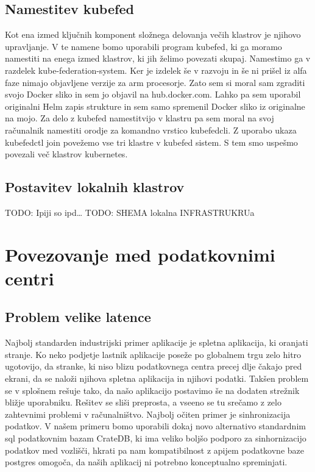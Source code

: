 \documentclass[a4paper, 12pt]{book}
\begin{document}
\section{Namestitev kubefed}
Kot ena izmed ključnih komponent složnega delovanja večih klastrov je njihovo upravljanje.
V te namene bomo uporabili program kubefed, ki ga moramo namestiti na enega izmed klastrov, ki jih želimo povezati skupaj.
Namestimo ga v razdelek kube-federation-system.
Ker je izdelek še v razvoju in še ni prišel iz alfa faze nimajo objavljene verzije za arm procesorje.
Zato sem si moral sam zgraditi svojo Docker sliko in sem jo objavil na hub.docker.com.
Lahko pa sem uporabil originalni Helm zapis strukture in sem samo spremenil Docker sliko iz originalne na mojo.
Za delo z kubefed namestitvijo v klastru pa sem moral na svoj računalnik namestiti orodje za komandno vrstico kubefedcli.
Z uporabo ukaza kubefedctl join povežemo vse tri klastre v kubefed sistem.
S tem smo uspešmo povezali več klastrov kubernetes.
\section{Postavitev lokalnih klastrov}
TODO: Ipiji so ipd\dots
TODO: SHEMA lokalna INFRASTRUKRUa
\chapter{Povezovanje med podatkovnimi centri}
\section{Problem velike latence}
Najbolj standarden industrijski primer aplikacije je spletna aplikacija, ki oranjati stranje. 
Ko neko podjetje lastnik aplikacije poseže po globalnem trgu zelo hitro ugotovijo, da stranke, ki niso blizu podatkovnega centra precej dlje čakajo pred ekrani, da se naloži njihova spletna aplikacija in njihovi podatki.
Takšen problem se v splošnem rešuje tako, da našo aplikacijo postavimo še na dodaten strežnik bližje uporabniku. 
Rešitev se sliši preprosta, a vseeno se tu srečamo z zelo zahtevnimi problemi v
računalništvo. Najbolj očiten primer je sinhronizacija podatkov.
V našem primeru bomo uporabili dokaj novo alternativo standardnim sql podatkovnim bazam CrateDB, ki ima veliko boljšo podporo za sinhornizacijo podatkov med vozlišči, hkrati pa nam kompatibilnost z apijem podatkovne baze postgres omogoča, da naših aplikacij ni potrebno konceptualno spreminjati.
\end{document}
